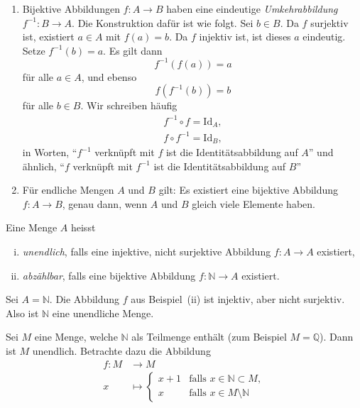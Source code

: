 \documentclass[../main.tex]{subfiles}
\begin{document}
\begin{remark}
  \leavevmode
  \begin{enumerate}[(1)]
    \item Bijektive Abbildungen $f \colon A \to B$ haben eine eindeutige \textit{Umkehrabbildung}
      $f^{-1} \colon B \to A$. Die Konstruktion dafür ist wie folgt. Sei $b \in B$.
      Da $f$ surjektiv ist, existiert $a \in A$ mit $f(a) = b$. Da $f$
      injektiv ist, ist dieses $a$ eindeutig. Setze $f^{-1}(b) = a$. Es gilt dann
      \[f^{-1}(f(a)) = a\]
      für alle $a \in A$, und ebenso
      \[f(f^{-1}(b)) = b\]
      für alle $b \in B$. Wir schreiben häufig
      \begin{align*}
        f^{-1} \circ f = \textrm{Id}_{A}, \\
        f \circ f^{-1} = \textrm{Id}_{B},
      \end{align*}
      in Worten, ``$f^{-1}$ verknüpft mit $f$ ist die Identitätsabbildung auf $A$''
      und ähnlich, ``$f$ verknüpft mit $f^{-1}$ ist die Identitätsabbildung auf $B$''
    \item Für endliche Mengen $A$ und $B$ gilt: Es existiert eine bijektive Abbildung
      $f: A \to B$, genau dann, wenn $A$ und $B$ gleich viele Elemente haben.
  \end{enumerate}
\end{remark}

\begin{definition}
  Eine Menge $A$ heisst
  \begin{enumerate}[(i)]
    \item \textit{unendlich}, falls eine injektive, nicht surjektive Abbildung
      $f: A \to A$ existiert,
    \item \textit{abzählbar}, falls eine bijektive Abbildung $f \colon \mathbb N \to A$
      existiert.
  \end{enumerate}
\end{definition}

\begin{example}
  Sei $A = \mathbb N$. Die Abbildung $f$ aus Beispiel~(ii) ist injektiv,
  aber nicht surjektiv. Also ist $\mathbb N$ eine unendliche Menge.
\end{example}

\begin{example}
  Sei $M$ eine Menge, welche $\mathbb N$ als Teilmenge enthält
  (zum Beispiel $M = \mathbb Q$).
  Dann ist $M$ unendlich. Betrachte dazu die Abbildung
  \begin{align*}
    f \colon M &\to M \\
    x &\mapsto
      \begin{cases}
        x+1 & \mbox{falls }x \in \mathbb N \subset M, \\
        x & \mbox{falls }x \in M \setminus \mathbb N
      \end{cases}
  \end{align*}
\end{example}
\end{document}
